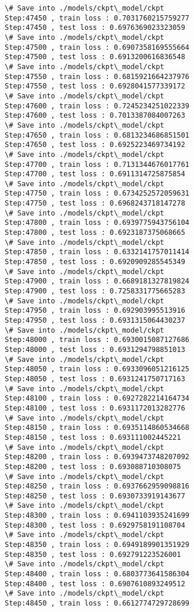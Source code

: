\documentclass[11pt]{article}
\begin{document}
\begin{Verbatim}[commandchars=\\\{\}]
\# Save into ./models/ckpt\_model/ckpt
Step:47450 , train loss : 0.7031760215759277
Step:47450 , test loss : 0.6976369023323059
\# Save into ./models/ckpt\_model/ckpt
Step:47500 , train loss : 0.6907358169555664
Step:47500 , test loss : 0.6913200616836548
\# Save into ./models/ckpt\_model/ckpt
Step:47550 , train loss : 0.6815921664237976
Step:47550 , test loss : 0.6928041577339172
\# Save into ./models/ckpt\_model/ckpt
Step:47600 , train loss : 0.7245234251022339
Step:47600 , test loss : 0.7013387084007263
\# Save into ./models/ckpt\_model/ckpt
Step:47650 , train loss : 0.6813234686851501
Step:47650 , test loss : 0.6925223469734192
\# Save into ./models/ckpt\_model/ckpt
Step:47700 , train loss : 0.7131344676017761
Step:47700 , test loss : 0.6911314725875854
\# Save into ./models/ckpt\_model/ckpt
Step:47750 , train loss : 0.6734252572059631
Step:47750 , test loss : 0.6968243718147278
\# Save into ./models/ckpt\_model/ckpt
Step:47800 , train loss : 0.6939775943756104
Step:47800 , test loss : 0.6923187375068665
\# Save into ./models/ckpt\_model/ckpt
Step:47850 , train loss : 0.6332141757011414
Step:47850 , test loss : 0.6920909285545349
\# Save into ./models/ckpt\_model/ckpt
Step:47900 , train loss : 0.6689181327819824
Step:47900 , test loss : 0.7258331775665283
\# Save into ./models/ckpt\_model/ckpt
Step:47950 , train loss : 0.692903995513916
Step:47950 , test loss : 0.6931315064430237
\# Save into ./models/ckpt\_model/ckpt
Step:48000 , train loss : 0.6930015087127686
Step:48000 , test loss : 0.6931294798851013
\# Save into ./models/ckpt\_model/ckpt
Step:48050 , train loss : 0.6933096051216125
Step:48050 , test loss : 0.6931241750717163
\# Save into ./models/ckpt\_model/ckpt
Step:48100 , train loss : 0.6927282214164734
Step:48100 , test loss : 0.6931172013282776
\# Save into ./models/ckpt\_model/ckpt
Step:48150 , train loss : 0.6935114860534668
Step:48150 , test loss : 0.693111002445221
\# Save into ./models/ckpt\_model/ckpt
Step:48200 , train loss : 0.6939473748207092
Step:48200 , test loss : 0.693088710308075
\# Save into ./models/ckpt\_model/ckpt
Step:48250 , train loss : 0.6937662959098816
Step:48250 , test loss : 0.6930733919143677
\# Save into ./models/ckpt\_model/ckpt
Step:48300 , train loss : 0.6941103935241699
Step:48300 , test loss : 0.6929758191108704
\# Save into ./models/ckpt\_model/ckpt
Step:48350 , train loss : 0.6949189901351929
Step:48350 , test loss : 0.692791223526001
\# Save into ./models/ckpt\_model/ckpt
Step:48400 , train loss : 0.6803773641586304
Step:48400 , test loss : 0.6907610893249512
\# Save into ./models/ckpt\_model/ckpt
Step:48450 , train loss : 0.6612774729728699

\end{Verbatim}
\end{document}
